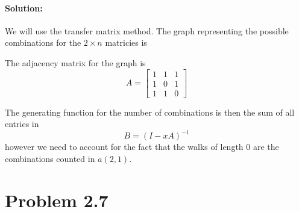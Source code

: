 \documentclass[a4paper,notitlepage]{article}
\theoremstyle{plain}
\theoremstyle{definition}
\begin{document}
\paragraph{Solution:}
We will use the transfer matrix method. The graph representing the possible combinations for the $2\times n$ matricies is
    \begin{center}
    \end{center}

    The adjacency matrix for the graph is
    \begin{equation*}
        A = \begin{bmatrix}
            1 & 1 & 1 \\
            1 & 0 & 1 \\
            1 & 1 & 0
        \end{bmatrix}
    \end{equation*}

    The generating function for the number of combinations is then the sum of all entries in 
\begin{equation*}
        B=(I-xA)^{-1}
\end{equation*}
however we need to account for the fact that the walks of length $0$ are the combinations counted in $a(2, 1)$.

\newpage

\section*{Problem 2.7}
\end{document}
